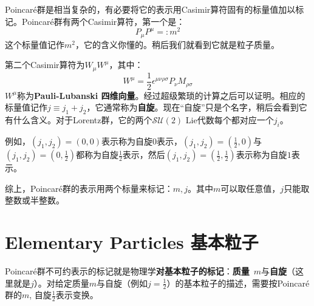 Poincar\'e群是相当复杂的，有必要将它的表示用Casimir算符固有的标量值加以标记。Poincar\'e群有两个Casimir算符，第一个是：
\begin{equation}
\label{equ3.258}
    P_\mu P^\mu =: m^2
\end{equation}
这个标量值记作$m^2$，它的含义你懂的。稍后我们就看到它就是粒子质量。

第二个Casimir算符为$W_\mu W^\mu$，其中：
\begin{equation}
\label{equ3.259}
    W^\mu = \frac{1}{2} \epsilon^{\mu \nu \rho \sigma} P_{\nu} M_{\rho \sigma}
\end{equation}
$W^\mu$称为{\bfseries Pauli-Lubanski 四维向量}。经过超级繁琐的计算之后可以证明。相应的标量值记作$j \equiv j_1 + j_2$，它通常称为{\bfseries 自旋}。现在“自旋”只是个名字，稍后会看到它有什么含义。对于Lorentz群，它的两个$\mathcal{SU}(2)$ Lie代数每个都对应一个$j_i$。

例如，$(j_1, j_2) = (0, 0)$表示称为自旋$0$表示，$(j_1, j_2) = (\frac{1}{2}, 0)$与$(j_1, j_2) = (0, \frac{1}{2})$都称为自旋$\frac{1}{2}$表示，然后$(j_1, j_2) = (\frac{1}{2}, \frac{1}{2})$表示称为自旋$1$表示。

综上，Poincar\'e群的表示用两个标量来标记：$m, j$。其中$m$可以取任意值，$j$只能取整数或半整数。

\section[基本粒子]{Elementary Particles \quad 基本粒子}
\label{sec3.9}
Poincar\'e群不可约表示的标记就是物理学{\bfseries 对基本粒子的标记}：{\bfseries 质量}\, $m$与{\bfseries 自旋}（这里就是$j$）。对给定质量$m$与自旋（例如$j = \frac{1}{2}$）的基本粒子的描述，需要按Poincar\'e群的$m$, 自旋$\frac{1}{2}$表示变换。

